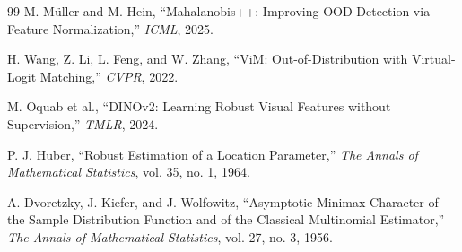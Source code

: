 \documentclass[uplatex,dvipdfmx,a4paper,10pt,twocolumn]{bxjsarticle}
\begin{document}
\begin{thebibliography}{99}
M. M\"uller and M. Hein,
``Mahalanobis++: Improving OOD Detection via Feature Normalization,''
\textit{ICML}, 2025.

H. Wang, Z. Li, L. Feng, and W. Zhang,
``ViM: Out-of-Distribution with Virtual-Logit Matching,''
\textit{CVPR}, 2022.

M. Oquab et al.,
``DINOv2: Learning Robust Visual Features without Supervision,''
\textit{TMLR}, 2024.

P. J. Huber,
``Robust Estimation of a Location Parameter,''
\textit{The Annals of Mathematical Statistics}, vol. 35, no. 1, 1964.

A. Dvoretzky, J. Kiefer, and J. Wolfowitz,
``Asymptotic Minimax Character of the Sample Distribution Function and of the Classical Multinomial Estimator,''
\textit{The Annals of Mathematical Statistics}, vol. 27, no. 3, 1956.

\end{thebibliography}
\end{document}
